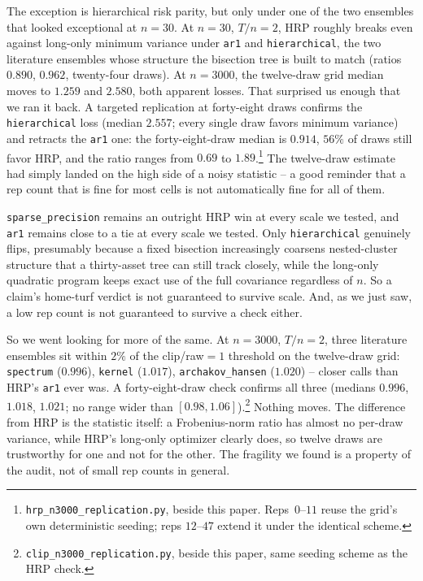 \documentclass[11pt]{article}
\begin{document}
The exception is hierarchical risk parity, but only under one of the two
ensembles that looked exceptional at $n=30$. At $n=30$, $T/n=2$, HRP
roughly breaks even against long-only minimum variance under
\texttt{ar1} and \texttt{hierarchical}, the two literature ensembles
whose structure the bisection tree is built to match (ratios $0.890$,
$0.962$, twenty-four draws). At $n=3000$, the twelve-draw grid median
moves to $1.259$ and $2.580$, both apparent losses. That surprised us
enough that we ran it back. A targeted
replication at forty-eight draws confirms the \texttt{hierarchical} loss
(median $2.557$; every single draw favors minimum variance) and retracts the
\texttt{ar1} one: the forty-eight-draw median is $0.914$, $56\%$ of
draws still favor HRP, and the ratio ranges from $0.69$ to
$1.89$.\footnote{\texttt{hrp\_n3000\_replication.py}, beside this paper.
Reps~$0$--$11$ reuse the grid's own deterministic seeding; reps
$12$--$47$ extend it under the identical scheme.} The twelve-draw
estimate had simply landed on the high side of a noisy statistic -- a
good reminder that a rep count that is fine for most cells is not
automatically fine for all of them.

\texttt{sparse\_precision} remains an outright HRP win at every scale we
tested, and \texttt{ar1} remains close to a tie at every scale we
tested. Only \texttt{hierarchical} genuinely flips, presumably because a fixed
bisection increasingly coarsens nested-cluster structure that a
thirty-asset tree can still track closely, while the long-only quadratic
program keeps exact use of the full covariance regardless of $n$. So a
claim's home-turf verdict is not guaranteed to survive scale. And, as we
just saw, a low rep count is not guaranteed to survive a check either.

So we went looking for more of the same. At $n=3000$, $T/n=2$, three
literature ensembles sit within $2\%$ of the clip/raw$=1$ threshold on
the twelve-draw grid: \texttt{spectrum} ($0.996$), \texttt{kernel}
($1.017$), \texttt{archakov\_hansen} ($1.020$) -- closer calls than HRP's
\texttt{ar1} ever was. A forty-eight-draw check confirms all three
(medians $0.996$, $1.018$, $1.021$; no range wider than $[0.98,
1.06]$).\footnote{\texttt{clip\_n3000\_replication.py}, beside this
paper, same seeding scheme as the HRP check.} Nothing moves. The
difference from HRP is the statistic itself: a Frobenius-norm ratio has
almost no per-draw variance, while HRP's long-only optimizer clearly
does, so twelve draws are trustworthy for one and not for the other. The
fragility we found is a property of the audit, not of small rep counts
in general.
\end{document}
